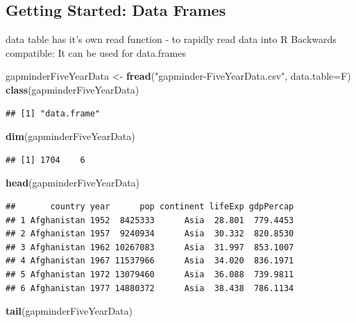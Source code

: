 \documentclass[]{article}
\newenvironment{Shaded}{\begin{snugshade}}{\end{snugshade}}
\newcommand{\KeywordTok}[1]{\textcolor[rgb]{0.13,0.29,0.53}{\textbf{{#1}}}}
\newcommand{\DataTypeTok}[1]{\textcolor[rgb]{0.13,0.29,0.53}{{#1}}}
\newcommand{\StringTok}[1]{\textcolor[rgb]{0.31,0.60,0.02}{{#1}}}
\newcommand{\NormalTok}[1]{{#1}}
\begin{document}
\subsection{Getting Started: Data
Frames}\label{getting-started-data-frames}

data table has it's own read function - to rapidly read data into R
Backwards compatible: It can be used for data.frames

\begin{Shaded}
\begin{Highlighting}[]
\NormalTok{gapminderFiveYearData <-}\StringTok{ }\KeywordTok{fread}\NormalTok{(}\StringTok{"gapminder-FiveYearData.csv"}\NormalTok{, }\DataTypeTok{data.table=}\NormalTok{F)}
\KeywordTok{class}\NormalTok{(gapminderFiveYearData)}
\end{Highlighting}
\end{Shaded}

\begin{verbatim}
## [1] "data.frame"
\end{verbatim}

\begin{Shaded}
\begin{Highlighting}[]
\KeywordTok{dim}\NormalTok{(gapminderFiveYearData)}
\end{Highlighting}
\end{Shaded}

\begin{verbatim}
## [1] 1704    6
\end{verbatim}

\begin{Shaded}
\begin{Highlighting}[]
\KeywordTok{head}\NormalTok{(gapminderFiveYearData)}
\end{Highlighting}
\end{Shaded}

\begin{verbatim}
##       country year      pop continent lifeExp gdpPercap
## 1 Afghanistan 1952  8425333      Asia  28.801  779.4453
## 2 Afghanistan 1957  9240934      Asia  30.332  820.8530
## 3 Afghanistan 1962 10267083      Asia  31.997  853.1007
## 4 Afghanistan 1967 11537966      Asia  34.020  836.1971
## 5 Afghanistan 1972 13079460      Asia  36.088  739.9811
## 6 Afghanistan 1977 14880372      Asia  38.438  786.1134
\end{verbatim}

\begin{Shaded}
\begin{Highlighting}[]
\KeywordTok{tail}\NormalTok{(gapminderFiveYearData)}
\end{Highlighting}
\end{Shaded}
\end{document}
